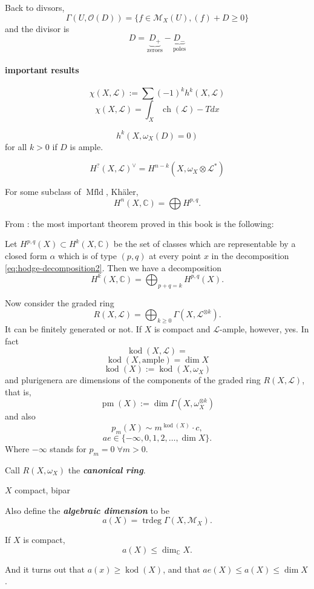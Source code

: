 \documentclass{article}
\newcommand{\C}{\mathbb{C}}
\newcommand{\Lc}{\mathcal{L}}
\newcommand{\Mc}{\mathcal{M}}
\newcommand{\Oc}{\mathcal{O}}
\DeclareMathOperator{\kod}{kod}
\DeclareMathOperator{\trdeg}{trdeg}
\DeclareMathOperator{\Mfld}{Mfld}
\DeclareMathOperator{\ch}{ch}
\begin{document}
Back to divsors,
\[\Gamma(U,\Oc(D))=\{f\in\Mc_X(U),(f)+D\geq0\}\]
and the divisor is
\[D=\underbrace{D_+}_{\text{zeroes}}-\underbrace{D_-}_{\text{poles}}\]
\paragraph{important results}
\begin{thm}
	\[\chi(X,\Lc):=\sum(-1)^kh^k(X,\Lc)\]
	\[\chi(X,\Lc)=\int_X\ch(\Lc)-Tdx\]
\end{thm}
\begin{thm}
	\[h^k(X,\omega_X(D)=0)\]
	for all $k>0$ if $D$ is ample.
\end{thm}
\begin{thm}
	\[H^?(X,\Lc)^\vee=H^{n-k}(X,\omega_X\otimes\Lc^*)\]
\end{thm}
\begin{thm}[Hodge]
	For some subclass of $\Mfld$, Khäler,
	\[H^n(X,\C)=\bigoplus H^{p,q}.\]
\end{thm}
From \cite{voisin-intro}: the most important theorem proved in this book is the following:
\begin{thm}
	Let $H^{p,q}(X) \subset H^k(X,\C)$ be the set of classes which are representable by a closed form $\alpha$ which is of type $(p,q)$ at every point $x$ in the decomposition \cref{eq:hodge-decomposition2}. Then we have a decomposition
	\[H^k(X,\C)=\bigoplus_{p+q=k}H^{p,q}(X).\]
\end{thm}
Now consider the graded ring
\[R(X,\Lc)=\bigoplus_{k\geq0}\Gamma(X,\Lc^{\otimes k}).\]
It can be finitely generated or not. If $X$ is compact and $\Lc$-ample, however, yes. In fact
\[\kod(X,\Lc)=\]
\[\kod(X,\text{ample})=\dim X\]
\[\kod(X):=\kod(X,\omega_X)\]
and plurigenera are dimensions of the components of the graded ring $R(X,\Lc)$, that is,
\[\operatorname{pm}(X):=\dim\Gamma(X,\omega_X^{\otimes k})\]
and also
\[p_m(X)\sim m^{\kod(X)}\cdot c,\]
\[ae\in\{-\infty,0,1,2,\ldots,\dim X\}.\]
Where $-\infty$ stands for $p_m=0\;\forall m>0$.

Call $R(X,\omega_X)$ the \textbf{\textit{canonical ring}}.
\begin{thm}[Caseini, et al. 2006]
	$X$ compact, bipar
\end{thm}
Also define the \textbf{\textit{algebraic dimension}} to be
\[a(X)=\trdeg\Gamma(X,\Mc_X).\]
\begin{thm}[Siegel]
	If $X$ is compact,
	\[a(X)\leq\dim_\C X.\]
\end{thm}
And it turns out that $a(x)\geq\kod(X)$, and that $ae(X)\leq a(X)\leq \dim X$.
\end{document}
